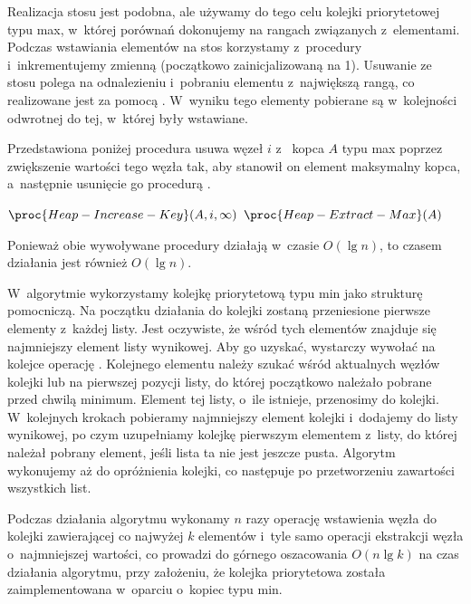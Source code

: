 Realizacja stosu jest podobna, ale używamy do tego celu kolejki priorytetowej typu max, w~której porównań dokonujemy na rangach związanych z~elementami. Podczas wstawiania elementów na stos korzystamy z~procedury  i~inkrementujemy zmienną  (początkowo zainicjalizowaną na 1). Usuwanie ze stosu polega na odnalezieniu i~pobraniu elementu z~największą rangą, co realizowane jest za pomocą . W~wyniku tego elementy pobierane są w~kolejności odwrotnej do tej, w~której były wstawiane.

\exercise %
Przedstawiona poniżej procedura  usuwa węzeł $i$ z~ kopca $A$ typu max poprzez zwiększenie wartości tego węzła tak, aby stanowił on element maksymalny kopca, a~następnie usunięcie go procedurą .
\begin{codebox}
\li	$\proc{Heap-Increase-Key}(A,i,\infty)$
\li	$\proc{Heap-Extract-Max}(A)$
\end{codebox}

Ponieważ obie wywoływane procedury działają w~czasie $O(\lg n)$, to czasem działania  jest również $O(\lg n)$.

\exercise %
W~algorytmie wykorzystamy kolejkę priorytetową typu min jako strukturę pomocniczą. Na początku działania do kolejki zostaną przeniesione pierwsze elementy z~każdej listy. Jest oczywiste, że wśród tych elementów znajduje się najmniejszy element listy wynikowej. Aby go uzyskać, wystarczy wywołać na kolejce operację . Kolejnego elementu należy szukać wśród aktualnych węzłów kolejki lub na pierwszej pozycji listy, do której początkowo należało pobrane przed chwilą minimum. Element tej listy, o~ile istnieje, przenosimy do kolejki. W~kolejnych krokach pobieramy najmniejszy element kolejki i~dodajemy do listy wynikowej, po czym uzupełniamy kolejkę pierwszym elementem z~listy, do której należał pobrany element, jeśli lista ta nie jest jeszcze pusta. Algorytm wykonujemy aż do opróżnienia kolejki, co następuje po przetworzeniu zawartości wszystkich list.

Podczas działania algorytmu wykonamy $n$ razy operację wstawienia węzła do kolejki zawierającej co najwyżej $k$ elementów i~tyle samo operacji ekstrakcji węzła o~najmniejszej wartości, co prowadzi do górnego oszacowania $O(n\lg k)$ na czas działania algorytmu, przy założeniu, że kolejka priorytetowa została zaimplementowana w~oparciu o~kopiec typu min.

